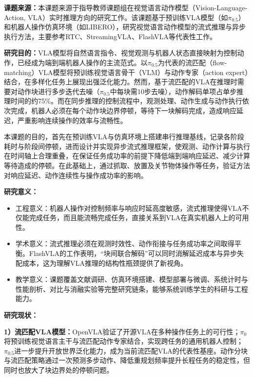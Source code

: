 

\textbf{课题来源：}本课题来源于指导教师课题组在视觉语言动作模型（Vision-Language-Action, VLA）实时推理方向的研究工作。该课题基于预训练VLA模型（如\(\pi_{0.5}\)）和机器人操作仿真环境（如LIBERO），研究视觉语言动作模型的流式推理与异步执行方法，主要参考RTC、StreamingVLA、FlashVLA等代表性工作。

\textbf{研究目的：}VLA模型将自然语言指令、视觉观测与机器人状态直接映射为控制动作，已经成为端到端机器人操作的主流范式。以\(\pi_{0.5}\)为代表的流匹配（flow-matching）VLA模型将预训练视觉语言骨干（VLM）与动作专家（action expert）结合，在多样化任务上展现出强泛化能力。然而，基于流匹配的VLA在推理时需要对动作块进行多步迭代去噪（\(\pi_{0.5}\)中每块需10步去噪），动作解码单项占单步推理时间的约75\%。而在同步推理的控制流程中，观测处理、动作生成与动作执行依次完成，机器人必须在每个动作块边界停顿，等待下一块解码完成，造成响应延迟，严重影响连续操作的效率与流畅性。

本课题的目的，首先在预训练VLA与仿真环境上搭建串行推理基线，记录各阶段耗时与阶段间停顿，进而设计并实现异步流式推理框架，使观测、动作计算与执行在时间轴上合理重叠，在保证任务成功率的前提下降低端到端响应延迟、减少计算等待造成的停顿。在此基础上，通过抓取、放置及关节物体操作等任务，验证方法对响应延迟、动作连续性与操作成功率的影响。

\textbf{研究意义：}

\begin{itemize}
  \item 工程意义：机器人操作对控制频率与响应时延高度敏感，流式推理使得VLA不仅能完成任务，而且能流畅完成任务，直接关系到VLA在真实机器人上的可用性。
  \item 学术意义：流式推理必须在观测时效性、动作衔接与任务成功率之间取得平衡。FlashVLA的工作表明，“块间联合解码”可以同时消解延迟成本与异步失配成本，这为理解VLA推理的结构性瓶颈提供了新视角。
  \item 教学意义：课题覆盖文献调研、仿真环境搭建、模型部署与微调、系统计时与性能剖析、对比与消融实验等完整研究链条，能够系统训练学生的科研与工程能力。
\end{itemize}


\textbf{研究现状：}

\textbf{1）流匹配VLA模型：}OpenVLA验证了开源VLA在多种操作任务上的可行性；\(\pi_0\)将预训练视觉语言主干与流匹配动作专家结合，实现跨任务的通用机器人控制；\(\pi_{0.5}\)进一步提升开放世界泛化能力，成为当前流匹配VLA的代表性基座。动作分块与流匹配策略通过一次预测多步动作、降低重规划频率提升长程任务的稳定性，但同时也放大了块边界处的停顿问题。


